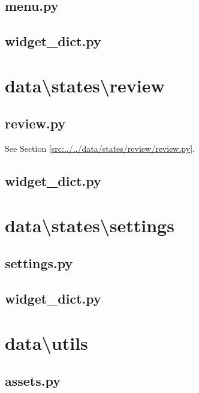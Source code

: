 \documentclass[../main/main.tex]{subfiles}
\begin{document}
\subsection{menu.py}

\label{src:data/states/menu/menu.py}

\subsection{widget\_dict.py}

\label{src:data/states/menu/widget_dict.py}

\section{data\textbackslash states\textbackslash review}
\subsection{review.py}
See Section \ref{src:../../data/states/review/review.py}.

\subsection{widget\_dict.py}

\label{src:data/states/review/widget_dict.py}

\section{data\textbackslash states\textbackslash settings}
\subsection{settings.py}

\label{src:data/states/settings/settings.py}

\subsection{widget\_dict.py}

\label{src:data/states/settings/widget_dict.py}

\section{data\textbackslash utils}
\subsection{assets.py}

\label{src:data/utils/assets.py}
\end{document}
